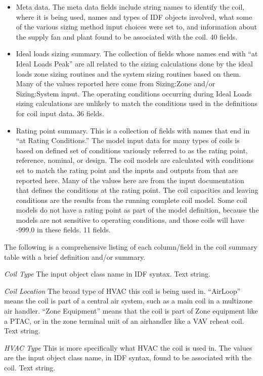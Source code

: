 \begin{itemize}
\item
  Meta data.  The meta data fields include string names to identify the coil, where it is being used, names and types of IDF objects involved, what some of the various sizing method input choices were set to, and information about the supply fan and plant found to be associated with the coil.  40 fields.
\item
  Ideal loads sizing summary. The collection of fields whose names end with ``at Ideal Loads Peak'' are all related to the sizing calculations done by the ideal loads zone sizing routines and the system sizing routines based on them.  Many of the values reported here come from Sizing:Zone and/or Sizing:System input.  The operating conditions occurring during Ideal Loads sizing calculations are unlikely to match the conditions used in the definitions for coil input data.  36 fields.
\item
  Rating point summary.  This is a collection of fields with names that end in ``at Rating Conditions.''  The model input data for many types of coils is based on defined set of conditions variously referred to as the rating point, reference, nominal, or design.  The coil models are calculated with conditions set to match the rating point and the inputs and outputs from that are reported here.  Many of the values here are from the input documentation that defines the conditions at the rating point. The coil capacities and leaving conditions are the results from the running complete coil model. Some coil models do not have a rating point as part of the model definition, because the models are not sensitive to operating conditions, and those coils will have -999.0 in these fields. 11 fields.
\end{itemize}

The following is a comprehensive listing of each column/field in the coil summary table with a brief definition and/or summary.

\emph{Coil Type} The input object class name in IDF syntax. Text string.

\emph{Coil Location} The broad type of HVAC this coil is being used in.  ``AirLoop'' means the coil is part of a central air system, such as a main coil in a multizone air handler.  ``Zone Equipment'' means that the coil is part of Zone equipment like a PTAC, or in the zone terminal unit of an airhandler like a VAV reheat coil.   Text string.

\emph{HVAC Type} This is more specifically what HVAC the coil is used in. The values are the input object class name, in IDF syntax, found to be associated with the coil. Text string.


